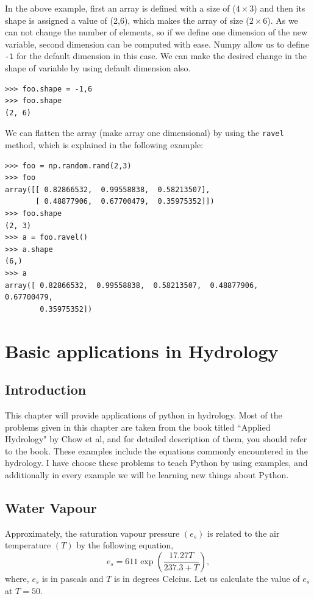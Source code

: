 \documentclass[10pt]{book}
\begin{document}
{In the above example, first an array is defined with a size of ($ 4 \times 3$) and then its shape is assigned a value of (2,6), which makes the array of size ($2 \times 6$). As we can not change the number of elements, so if we define one dimension of the new variable, second dimension can be computed  with ease. Numpy allow us to define \verb"-1" for the default dimension in this case. We can make the desired change in the shape of variable by using default dimension also.
\beforeverb \begin{verbatim}
>>> foo.shape = -1,6
>>> foo.shape
(2, 6)
\end{verbatim} \afterverb
{}

We can flatten the array (make array one dimensional) by using the \verb"ravel" method, which is explained in the following example:
\beforeverb
\begin{verbatim}
>>> foo = np.random.rand(2,3)
>>> foo
array([[ 0.82866532,  0.99558838,  0.58213507],
       [ 0.48877906,  0.67700479,  0.35975352]])
>>> foo.shape
(2, 3)
>>> a = foo.ravel()
>>> a.shape
(6,)
>>> a
array([ 0.82866532,  0.99558838,  0.58213507,  0.48877906,  0.67700479,
        0.35975352])
\end{verbatim}
\afterverb


\chapter{Basic applications in Hydrology}
\section{Introduction}
This chapter will provide applications of python in hydrology. Most of the problems given in this chapter are taken from the book titled ``Applied Hydrology" by Chow et al, and for detailed description of them, you should refer to the book. These examples include the equations commonly encountered in the hydrology. I have choose these problems to teach Python by using examples, and additionally in every example we will be learning new things about Python. \\

\section{Water Vapour}
Approximately, the saturation vapour pressure $(e_s)$ is related to the air temperature $(T)$ by the following equation,
\begin{equation}
e_s = 611 \exp\left( \frac{17.27T}{237.3+T} \right),
\end{equation}
where, $e_s$ is in pascals and $T$ is in degrees Celcius. Let us calculate the value of $e_s$ at $T=50$.

}
\end{document}
